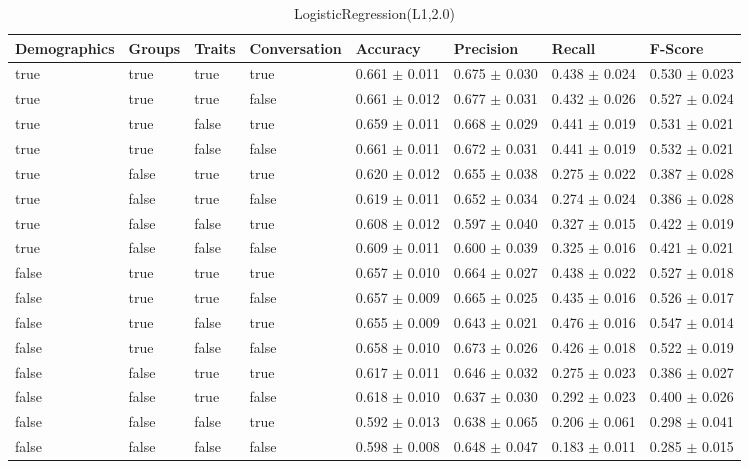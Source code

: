 \clearpage
\begin{table}[h]
	\centering
	\begin{tabular}{|l|l|l|l|l|l|l|l|} %
	\hline
	Demographics & Groups & Traits & Conversation & Accuracy & Precision & Recall & F-Score \\ \hline
	true & true & true & true & 0.661	\( \pm \) 0.011	& 0.675	\( \pm \) 0.030	& 0.438	\( \pm \) 0.024	& 0.530	\( \pm \) 0.023	\\ \hline
	true & true & true & false & 0.661	\( \pm \) 0.012	& 0.677	\( \pm \) 0.031	& 0.432	\( \pm \) 0.026	& 0.527	\( \pm \) 0.024	\\ \hline
	true & true & false & true & 0.659	\( \pm \) 0.011	& 0.668	\( \pm \) 0.029	& 0.441	\( \pm \) 0.019	& 0.531	\( \pm \) 0.021	\\ \hline
	true & true & false & false & 0.661	\( \pm \) 0.011	& 0.672	\( \pm \) 0.031	& 0.441	\( \pm \) 0.019	& 0.532	\( \pm \) 0.021	\\ \hline
	true & false & true & true & 0.620	\( \pm \) 0.012	& 0.655	\( \pm \) 0.038	& 0.275	\( \pm \) 0.022	& 0.387	\( \pm \) 0.028	\\ \hline
	true & false & true & false & 0.619	\( \pm \) 0.011	& 0.652	\( \pm \) 0.034	& 0.274	\( \pm \) 0.024	& 0.386	\( \pm \) 0.028	\\ \hline
	true & false & false & true & 0.608	\( \pm \) 0.012	& 0.597	\( \pm \) 0.040	& 0.327	\( \pm \) 0.015	& 0.422	\( \pm \) 0.019	\\ \hline
	true & false & false & false & 0.609	\( \pm \) 0.011	& 0.600	\( \pm \) 0.039	& 0.325	\( \pm \) 0.016	& 0.421	\( \pm \) 0.021	\\ \hline
	false & true & true & true & 0.657	\( \pm \) 0.010	& 0.664	\( \pm \) 0.027	& 0.438	\( \pm \) 0.022	& 0.527	\( \pm \) 0.018	\\ \hline
	false & true & true & false & 0.657	\( \pm \) 0.009	& 0.665	\( \pm \) 0.025	& 0.435	\( \pm \) 0.016	& 0.526	\( \pm \) 0.017	\\ \hline
	false & true & false & true & 0.655	\( \pm \) 0.009	& 0.643	\( \pm \) 0.021	& 0.476	\( \pm \) 0.016	& 0.547	\( \pm \) 0.014	\\ \hline
	false & true & false & false & 0.658	\( \pm \) 0.010	& 0.673	\( \pm \) 0.026	& 0.426	\( \pm \) 0.018	& 0.522	\( \pm \) 0.019	\\ \hline
	false & false & true & true & 0.617	\( \pm \) 0.011	& 0.646	\( \pm \) 0.032	& 0.275	\( \pm \) 0.023	& 0.386	\( \pm \) 0.027	\\ \hline
	false & false & true & false & 0.618	\( \pm \) 0.010	& 0.637	\( \pm \) 0.030	& 0.292	\( \pm \) 0.023	& 0.400	\( \pm \) 0.026	\\ \hline
	false & false & false & true & 0.592	\( \pm \) 0.013	& 0.638	\( \pm \) 0.065	& 0.206	\( \pm \) 0.061	& 0.298	\( \pm \) 0.041	\\ \hline
	false & false & false & false & 0.598	\( \pm \) 0.008	& 0.648	\( \pm \) 0.047	& 0.183	\( \pm \) 0.011	& 0.285	\( \pm \) 0.015	\\ \hline
	\end{tabular}
	\caption{LogisticRegression(L1,2.0)}
	\label{tab:revpol}
\end{table}
